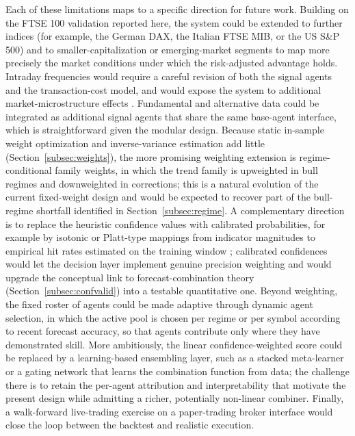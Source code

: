 \documentclass{ieeeaccess}
\begin{document}
Each of these limitations maps to a specific direction for future work. Building on the FTSE 100 validation reported here, the system could be extended to further indices (for example, the German DAX, the Italian FTSE MIB, or the US S\&P 500) and to smaller-capitalization or emerging-market segments to map more precisely the market conditions under which the risk-adjusted advantage holds. Intraday frequencies would require a careful revision of both the signal agents and the transaction-cost model, and would expose the system to additional market-microstructure effects \cite{tusien2025mining}. Fundamental and alternative data could be integrated as additional signal agents that share the same base-agent interface, which is straightforward given the modular design. Because static in-sample weight optimization and inverse-variance estimation add little (Section~\ref{subsec:weights}), the more promising weighting extension is regime-conditional family weights, in which the trend family is upweighted in bull regimes and downweighted in corrections; this is a natural evolution of the current fixed-weight design and would be expected to recover part of the bull-regime shortfall identified in Section~\ref{subsec:regime}. A complementary direction is to replace the heuristic confidence values with calibrated probabilities, for example by isotonic or Platt-type mappings from indicator magnitudes to empirical hit rates estimated on the training window \cite{murphywinkler1987}; calibrated confidences would let the decision layer implement genuine precision weighting and would upgrade the conceptual link to forecast-combination theory (Section~\ref{subsec:confvalid}) into a testable quantitative one. Beyond weighting, the fixed roster of agents could be made adaptive through dynamic agent selection, in which the active pool is chosen per regime or per symbol according to recent forecast accuracy, so that agents contribute only where they have demonstrated skill. More ambitiously, the linear confidence-weighted score could be replaced by a learning-based ensembling layer, such as a stacked meta-learner or a gating network that learns the combination function from data; the challenge there is to retain the per-agent attribution and interpretability that motivate the present design while admitting a richer, potentially non-linear combiner. Finally, a walk-forward live-trading exercise on a paper-trading broker interface would close the loop between the backtest and realistic execution.

\end{document}
